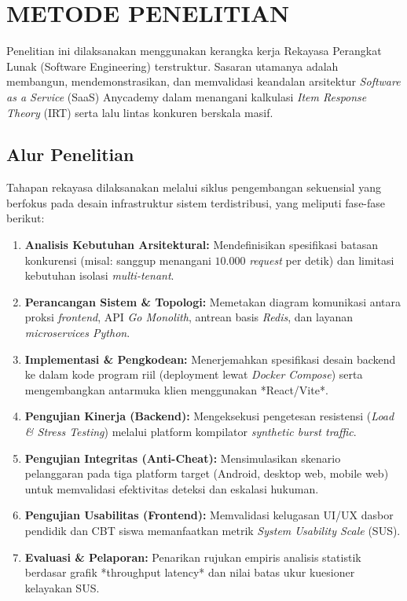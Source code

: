 \chapter{METODE PENELITIAN}


Penelitian ini dilaksanakan menggunakan kerangka kerja Rekayasa Perangkat Lunak (Software Engineering) terstruktur. Sasaran utamanya adalah membangun, mendemonstrasikan, dan memvalidasi keandalan arsitektur \textit{Software as a Service} (SaaS) Anycademy dalam menangani kalkulasi \textit{Item Response Theory} (IRT) serta lalu lintas konkuren berskala masif.

\section{Alur Penelitian}

Tahapan rekayasa dilaksanakan melalui siklus pengembangan sekuensial yang berfokus pada desain infrastruktur sistem terdistribusi, yang meliputi fase-fase berikut:

\begin{enumerate}
	\item \textbf{Analisis Kebutuhan Arsitektural:} Mendefinisikan spesifikasi batasan konkurensi (misal: sanggup menangani $10.000$ \textit{request} per detik) dan limitasi kebutuhan isolasi \textit{multi-tenant}.
	\item \textbf{Perancangan Sistem \& Topologi:} Memetakan diagram komunikasi antara proksi \textit{frontend}, API \textit{Go Monolith}, antrean basis \textit{Redis}, dan layanan \textit{microservices Python}.
	\item \textbf{Implementasi \& Pengkodean:} Menerjemahkan spesifikasi desain backend ke dalam kode program riil (deployment lewat \textit{Docker Compose}) serta mengembangkan antarmuka klien menggunakan *React/Vite*.
	\item \textbf{Pengujian Kinerja (Backend):} Mengeksekusi pengetesan resistensi (\textit{Load \& Stress Testing}) melalui platform kompilator \textit{synthetic burst traffic}.
	\item \textbf{Pengujian Integritas (Anti-Cheat):} Mensimulasikan skenario pelanggaran pada tiga platform target (Android, desktop web, mobile web) untuk memvalidasi efektivitas deteksi dan eskalasi hukuman.
	\item \textbf{Pengujian Usabilitas (Frontend):} Memvalidasi kelugasan UI/UX dasbor pendidik dan CBT siswa memanfaatkan metrik \textit{System Usability Scale} (SUS).
	\item \textbf{Evaluasi \& Pelaporan:} Penarikan rujukan empiris analisis statistik berdasar grafik *throughput latency* dan nilai batas ukur kuesioner kelayakan SUS.
\end{enumerate}

